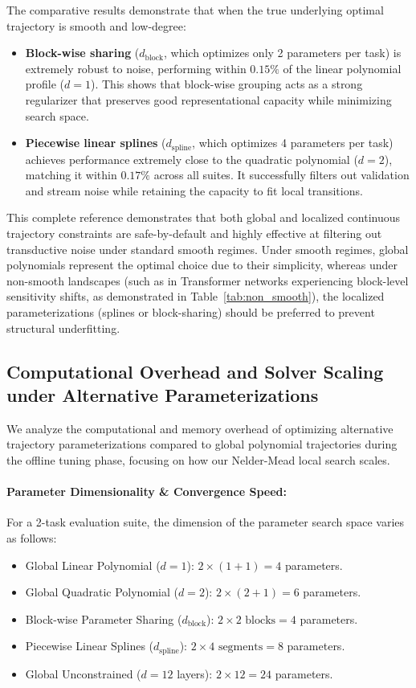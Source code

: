 The comparative results demonstrate that when the true underlying optimal trajectory is smooth and low-degree:
\begin{itemize}
    \item \textbf{Block-wise sharing} ($d_{\text{block}}$, which optimizes only 2 parameters per task) is extremely robust to noise, performing within $0.15\%$ of the linear polynomial profile ($d=1$).
This shows that block-wise grouping acts as a strong regularizer that preserves good representational capacity while minimizing search space.
    \item \textbf{Piecewise linear splines} ($d_{\text{spline}}$, which optimizes 4 parameters per task) achieves performance extremely close to the quadratic polynomial ($d=2$), matching it within $0.17\%$ across all suites.
It successfully filters out validation and stream noise while retaining the capacity to fit local transitions.
\end{itemize}
This complete reference demonstrates that both global and localized continuous trajectory constraints are safe-by-default and highly effective at filtering out transductive noise under standard smooth regimes.
Under smooth regimes, global polynomials represent the optimal choice due to their simplicity, whereas under non-smooth landscapes (such as in Transformer networks experiencing block-level sensitivity shifts, as demonstrated in Table~\ref{tab:non_smooth}), the localized parameterizations (splines or block-sharing) should be preferred to prevent structural underfitting.

\subsection{Computational Overhead and Solver Scaling under Alternative Parameterizations}
\label{subsec:comp_overhead_scaling}

We analyze the computational and memory overhead of optimizing alternative trajectory parameterizations compared to global polynomial trajectories during the offline tuning phase, focusing on how our Nelder-Mead local search scales.

\paragraph{Parameter Dimensionality \& Convergence Speed:}
For a 2-task evaluation suite, the dimension of the parameter search space varies as follows:
\begin{itemize}
    \item Global Linear Polynomial ($d=1$): $2 \times (1 + 1) = 4$ parameters.
    \item Global Quadratic Polynomial ($d=2$): $2 \times (2 + 1) = 6$ parameters.
    \item Block-wise Parameter Sharing ($d_{\text{block}}$): $2 \times 2 \text{ blocks} = 4$ parameters.
    \item Piecewise Linear Splines ($d_{\text{spline}}$): $2 \times 4 \text{ segments} = 8$ parameters.
    \item Global Unconstrained ($d=12$ layers): $2 \times 12 = 24$ parameters.
\end{itemize}


